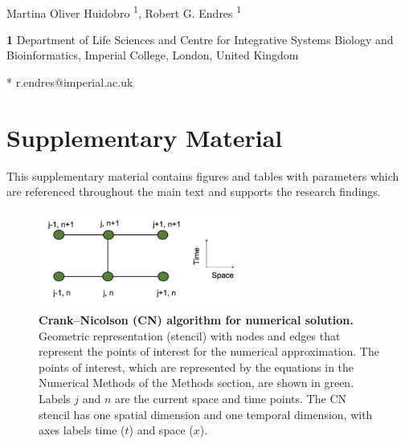 \documentclass[10pt,letterpaper]{article}
\begin{document}
\vspace*{0.2in}

\begin{flushleft}
{\Large
\textbf{} %
}
\newline
\\
Martina Oliver Huidobro \textsuperscript{1},
Robert G. Endres \textsuperscript{1}


\bigskip
\textbf{1} Department of Life Sciences and Centre for Integrative Systems Biology and Bioinformatics, Imperial College, London, United Kingdom
\\
\bigskip

* r.endres@imperial.ac.uk

\end{flushleft}



\section*{Supplementary Material}

This supplementary material contains figures and tables with parameters which are referenced throughout the main text and supports the research findings.

\newcommand{\beginsupplement}{%
    \setcounter{table}{0}
    \renewcommand{\thetable}{S\arabic{table}}%
    \setcounter{figure}{0}
    \renewcommand{\thefigure}{S\arabic{figure}}%
}
\beginsupplement

\begin{figure}[!ht]
    \center
    \includegraphics[width=0.6\textwidth]{figures/stencils}

    \caption{{\bf Crank–Nicolson (CN) algorithm for numerical solution.}  Geometric representation (stencil) with nodes and edges that represent the points of interest for the numerical approximation. The points of interest, which are represented by the equations in the Numerical Methods of the Methods section, are shown in green. Labels $j$ and $n$ are the current space and time points. The CN stencil has one spatial dimension and one temporal dimension, with axes labels time ($t$) and space ($x$). }   \label{sup_fig1}
\end{figure}
\end{document}
